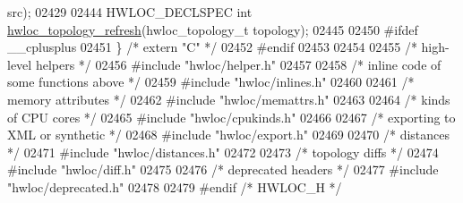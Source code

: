 \begin{DoxyCode}
      src);
02429 
02444 HWLOC\_DECLSPEC \textcolor{keywordtype}{int} \hyperlink{a00194_ga698ecd640d2b76742bba3829a145cd9a}{hwloc\_topology\_refresh}(hwloc\_topology\_t topology);
02445 
02450 \textcolor{preprocessor}{#ifdef \_\_cplusplus}
02451 \} \textcolor{comment}{/* extern "C" */}
02452 \textcolor{preprocessor}{#endif}
02453 
02454 
02455 \textcolor{comment}{/* high-level helpers */}
02456 \textcolor{preprocessor}{#include "hwloc/helper.h"}
02457 
02458 \textcolor{comment}{/* inline code of some functions above */}
02459 \textcolor{preprocessor}{#include "hwloc/inlines.h"}
02460 
02461 \textcolor{comment}{/* memory attributes */}
02462 \textcolor{preprocessor}{#include "hwloc/memattrs.h"}
02463 
02464 \textcolor{comment}{/* kinds of CPU cores */}
02465 \textcolor{preprocessor}{#include "hwloc/cpukinds.h"}
02466 
02467 \textcolor{comment}{/* exporting to XML or synthetic */}
02468 \textcolor{preprocessor}{#include "hwloc/export.h"}
02469 
02470 \textcolor{comment}{/* distances */}
02471 \textcolor{preprocessor}{#include "hwloc/distances.h"}
02472 
02473 \textcolor{comment}{/* topology diffs */}
02474 \textcolor{preprocessor}{#include "hwloc/diff.h"}
02475 
02476 \textcolor{comment}{/* deprecated headers */}
02477 \textcolor{preprocessor}{#include "hwloc/deprecated.h"}
02478 
02479 \textcolor{preprocessor}{#endif }\textcolor{comment}{/* HWLOC\_H */}\textcolor{preprocessor}{}
\end{DoxyCode}
